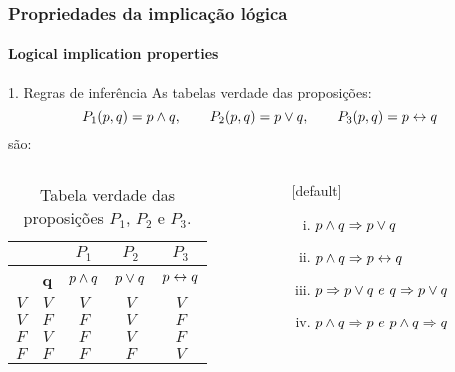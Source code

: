 \begin{frame}[t]
    \frametitle{Propriedades da implicação lógica}
    \framesubtitle{Logical implication properties}
    \begin{exampleblock}{1. Regras de inferência}
        As tabelas verdade das proposições:
        $$ P_1(p,q) = p \land q, \qquad  P_2(p,q) = p \lor q, \qquad P_3(p,q) = p \leftrightarrow q$$
        são:
    \end{exampleblock}
    \vspace{-4mm}
    \begin{columns}
        \begin{column}{0.5\textwidth}
            \small
            \begin{table}[]
                \caption{Tabela verdade das proposições $P_1$, $P_2$ e $P_3$.}
                \label{tab:exemple-31}
                \vspace{-2mm}
                \begin{tabular}{cc||c|c|c|}
                \cline{3-5}
                \multicolumn{1}{l}{}                                     & \multicolumn{1}{l|}{} & $P_1$    & $P_2$     & $P_3$     \\ \hline
                \rowcolor[HTML]{EFEFEF} 
                \multicolumn{1}{|c|}{\cellcolor[HTML]{EFEFEF}\textbf{p}} & \textbf{q}            & $p \land q$ & $p \lor q$ & $p \leftrightarrow q$ \\ \hline
                \multicolumn{1}{|c|}{$V$}                                & $V$                   & $V$      & $V$       & $V$       \\ \hline
                \multicolumn{1}{|c|}{$V$}                                & $F$                   & $F$      & $V$       & $F$       \\ \hline
                \multicolumn{1}{|c|}{$F$}                                & $V$                   & $F$      & $V$       & $F$       \\ \hline
                \multicolumn{1}{|c|}{$F$}                                & $F$                   & $F$      & $F$       & $V$       \\ \hline
                \end{tabular}
            \end{table}
        \end{column}
        \hspace{-6mm}
        \begin{column}{0.4\textwidth}
            [default]
            \begin{enumerate}[(i)]
                \item $p \land q \Rightarrow p \lor q$
                \item $p \land q \Rightarrow p \leftrightarrow q$
                \item $p \Rightarrow p \lor q ~e~ q \Rightarrow p \lor q$
                \item $p \land q \Rightarrow p ~e~ p \land q \Rightarrow q$
            \end{enumerate}
        \end{column}
    \end{columns}
\end{frame}
